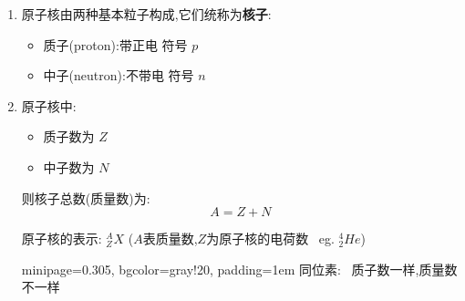 \documentclass{article}
\begin{document}
\begin{enumerate}
    \item 原子核由两种基本粒子构成,它们统称为\textbf{核子}:

          \begin{itemize}
              \item 质子(proton):带正电 \quad 符号 $p$
              \item 中子(neutron):不带电 \quad 符号 $n$
          \end{itemize}

    \item 原子核中:
          \begin{itemize}
              \item 质子数为 $Z$
              \item 中子数为 $N$
          \end{itemize}
          则核子总数(质量数)为:
          $$
              A = Z + N
          $$

          原子核的表示: $_{Z}^{A}X$ \quad ($A$表质量数,$Z$为原子核的电荷数 \, eg. $_{2}^{4}He$)

          \vspace{-1em}
          \hspace{-0.9em}\begin{adjustbox}{minipage=0.305\linewidth, bgcolor=gray!20, padding=1em}
              \small
              同位素: \, 质子数一样,质量数不一样
          \end{adjustbox}
          \vspace{-1em}
\end{enumerate}

\vspace{2em}
\end{document}
